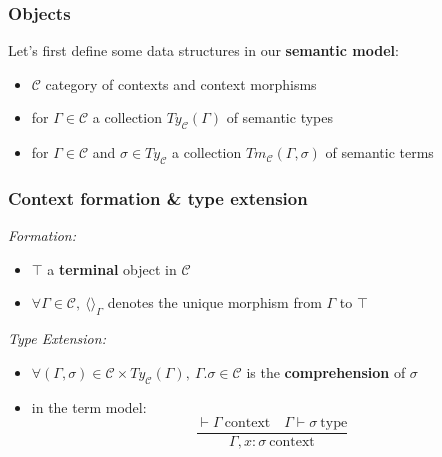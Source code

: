 \documentclass[aspectratio=169]{beamer}
\newcommand{\cntxt}{\ \mathrm{context}}
\newcommand{\typ}{\ \mathrm{type}}
\newcommand{\Gamdash}{\Gamma\vdash}
\newcommand{\cate}{\mathcal{C}}
\newcommand{\types}{Ty_{\cate}}
\newcommand{\terms}{Tm_{\cate}}
\newcommand{\extension}{\Gamma.\sigma}
\begin{document}
    \begin{frame}
        \frametitle{Objects}
        Let's first define some data structures in our \textbf{semantic model}:
        \vspace{8pt}
        \begin{itemize}
            \item $\cate$ category of contexts and context morphisms
            \vspace{8pt}
            \item for $\Gamma\in\cate$ a collection $\types(\Gamma)$ of semantic types
            \vspace{8pt}
            \item for $\Gamma\in\cate$ and $\sigma\in\types$ a collection $\terms(\Gamma,\sigma)$ of semantic terms
        \end{itemize}
    \end{frame}
    
    \begin{frame}
        \frametitle{Context formation \& type extension}
        \emph{Formation:}
        \begin{itemize}
            \item $\top$ a \textbf{terminal} object in $\cate$
            \item $\forall \Gamma \in \cate,\ \langle\rangle_\Gamma$ denotes the unique morphism from $\Gamma$ to $\top$ 
        \end{itemize}
        \vspace{15pt}
        \emph{Type Extension:}
        \begin{itemize}
            \item $\forall (\Gamma,\sigma) \in \cate \times \types(\Gamma),\ \extension\in\cate$ is the \textbf{comprehension} of $\sigma$
            \item in the term model:
            $$\frac{\vdash\Gamma \cntxt\quad\Gamdash\sigma\typ}{\Gamma,x:\sigma\cntxt}$$
        \end{itemize}
    \end{frame}
\end{document}

